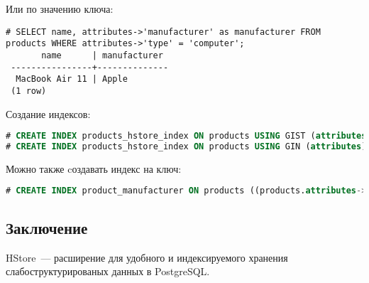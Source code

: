 Или по значению ключа:
\begin{lstlisting}[label=lst:hstore5,caption=Поиск по значению ключа]
# SELECT name, attributes->'manufacturer' as manufacturer FROM products WHERE attributes->'type' = 'computer';
       name      | manufacturer
 ----------------+--------------
  MacBook Air 11 | Apple
 (1 row)
\end{lstlisting}

Создание индексов:

\begin{lstlisting}[language=SQL,label=lst:hstore6,caption=Индексы]
# CREATE INDEX products_hstore_index ON products USING GIST (attributes);
# CREATE INDEX products_hstore_index ON products USING GIN (attributes);
\end{lstlisting}

Можно также cоздавать индекс на ключ:

\begin{lstlisting}[language=SQL,label=lst:hstore7,caption=Индекс на ключ]
# CREATE INDEX product_manufacturer ON products ((products.attributes->'manufacturer'));
\end{lstlisting}

\subsection{Заключение}

HStore~--- расширение для удобного и индексируемого хранения слабоструктурированых данных в PostgreSQL.